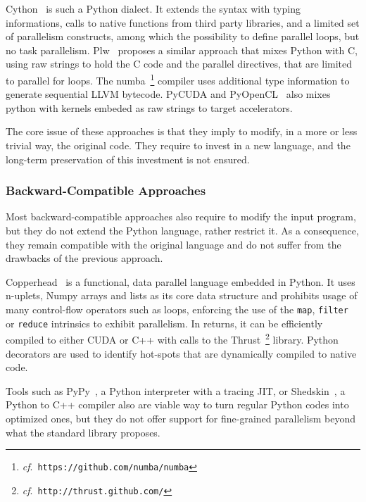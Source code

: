 \documentclass{llncs}
\begin{document}
Cython~\cite{cython2010} is such a Python dialect. It extends the syntax with
typing informations, calls to native functions from third party libraries, and a
limited set of parallelism constructs, among which the possibility to define
parallel loops, but no task parallelism. Plw~\cite{dongara2007} proposes a
similar approach that mixes Python with C, using raw strings to hold the C code
and the parallel directives, that are limited to parallel for loops.  The
numba~\footnote{\emph{cf}.\ \texttt{https://github.com/numba/numba}} compiler
uses additional type information to generate sequential LLVM bytecode.  PyCUDA
and PyOpenCL~\cite{klockner2012} also mixes python with kernels embeded as raw
strings to target accelerators.

The core issue of these approaches is that they imply to modify, in a more or
less trivial way, the original code. They require to invest in a new language,
and the long-term preservation of this investment is not ensured.

\subsubsection{Backward-Compatible Approaches}

Most backward-compatible approaches also require to modify the input program,
but they do not extend the Python language, rather restrict it. As a
consequence, they remain compatible with the original language and do not suffer
from the drawbacks of the previous approach.

Copperhead~\cite{shedskin2006} is a functional, data parallel language embedded in
Python. It uses n-uplets, Numpy arrays and lists as its core data structure and
prohibits usage of many control-flow operators such as loops, enforcing the use
of the \texttt{map}, \texttt{filter} or \texttt{reduce} intrinsics to exhibit
parallelism. In returns, it can be efficiently compiled to either CUDA or C++
with calls to the Thrust~\footnote{\emph{cf}.\
\texttt{http://thrust.github.com/}} library. Python decorators are used to
identify hot-spots that are dynamically compiled to native code.

Tools such as PyPy~\cite{pypy2009}, a Python interpreter with a tracing JIT, or
Shedskin~\cite{shedskin2006}, a Python to C++ compiler also are viable way to
turn regular Python codes into optimized ones, but they do not offer support for
fine-grained parallelism beyond what the standard library
proposes.
\end{document}
